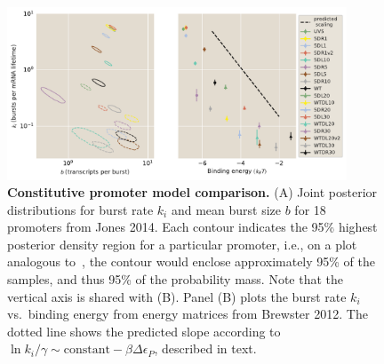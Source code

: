 \begin{figure}%
\centering
\includegraphics[width=0.9\textwidth]{../figures/fig2/fig2pt2.pdf}
\caption{\textbf{Constitutive promoter model comparison.}
    (A) Joint posterior distributions for burst rate $k_i$ and mean burst size
    $b$ for 18 promoters from Jones 2014. Each contour indicates the 95\%
    highest posterior density region for a particular promoter, i.e., on a plot
    analogous to~, the contour would enclose approximately
    95\% of the samples, and thus 95\% of the probability mass. Note that the
    vertical axis is shared with (B). Panel (B) plots the burst rate $k_i$ vs.\
    binding energy from energy matrices from Brewster 2012. The dotted line
    shows the predicted slope according to $\ln k_i/\gamma \sim \text{constant}
    - \beta\Delta\epsilon_P$, described in text.}
\label{fig:constit_post}
\end{figure}

